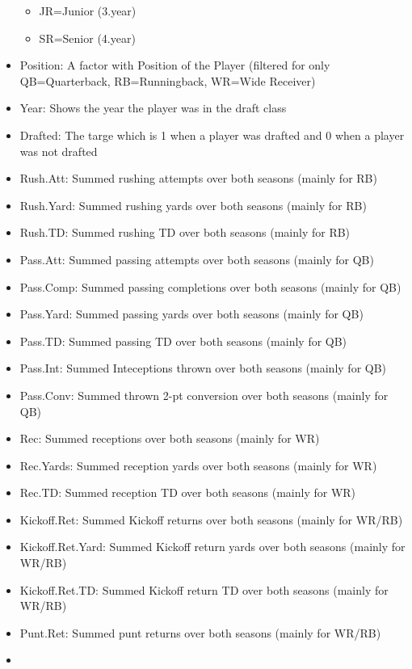\documentclass[]{article}
\providecommand{\tightlist}{%
  \setlength{\itemsep}{0pt}\setlength{\parskip}{0pt}}
\begin{document}
\begin{itemize}
  \begin{itemize}
  \tightlist
  \item
    JR=Junior (3.year)
  \item
    SR=Senior (4.year)
  \end{itemize}
\item
  Position: A factor with Position of the Player (filtered for only
  QB=Quarterback, RB=Runningback, WR=Wide Receiver)
\item
  Year: Shows the year the player was in the draft class
\item
  Drafted: The targe which is 1 when a player was drafted and 0 when a
  player was not drafted
\item
  Rush.Att: Summed rushing attempts over both seasons (mainly for RB)
\item
  Rush.Yard: Summed rushing yards over both seasons (mainly for RB)
\item
  Rush.TD: Summed rushing TD over both seasons (mainly for RB)
\item
  Pass.Att: Summed passing attempts over both seasons (mainly for QB)
\item
  Pass.Comp: Summed passing completions over both seasons (mainly for
  QB)
\item
  Pass.Yard: Summed passing yards over both seasons (mainly for QB)
\item
  Pass.TD: Summed passing TD over both seasons (mainly for QB)
\item
  Pass.Int: Summed Inteceptions thrown over both seasons (mainly for QB)
\item
  Pass.Conv: Summed thrown 2-pt conversion over both seasons (mainly for
  QB)
\item
  Rec: Summed receptions over both seasons (mainly for WR)
\item
  Rec.Yards: Summed reception yards over both seasons (mainly for WR)
\item
  Rec.TD: Summed reception TD over both seasons (mainly for WR)
\item
  Kickoff.Ret: Summed Kickoff returns over both seasons (mainly for
  WR/RB)
\item
  Kickoff.Ret.Yard: Summed Kickoff return yards over both seasons
  (mainly for WR/RB)
\item
  Kickoff.Ret.TD: Summed Kickoff return TD over both seasons (mainly for
  WR/RB)
\item
  Punt.Ret: Summed punt returns over both seasons (mainly for WR/RB)
\item

\end{itemize}
\end{document}
